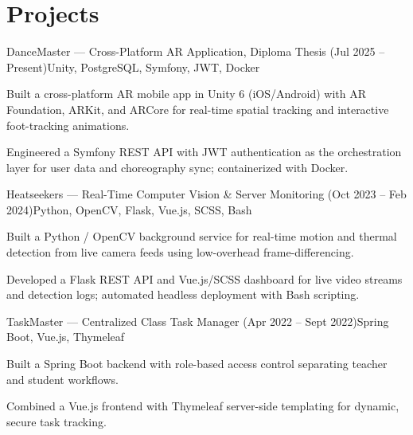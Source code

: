 \section*{Projects}

\begin{projectentry}{DanceMaster --- Cross-Platform AR Application, Diploma Thesis (Jul 2025 -- Present)}{Unity, PostgreSQL, Symfony, JWT, Docker}
  \item Built a cross-platform AR mobile app in Unity 6 (iOS/Android) with AR Foundation, ARKit, and ARCore for real-time spatial tracking and interactive foot-tracking animations.
  \item Engineered a Symfony REST API with JWT authentication as the orchestration layer for user data and choreography sync; containerized with Docker.
\end{projectentry}

\begin{projectentry}{Heatseekers --- Real-Time Computer Vision \& Server Monitoring (Oct 2023 -- Feb 2024)}{Python, OpenCV, Flask, Vue.js, SCSS, Bash}
  \item Built a Python / OpenCV background service for real-time motion and thermal detection from live camera feeds using low-overhead frame-differencing.
  \item Developed a Flask REST API and Vue.js/SCSS dashboard for live video streams and detection logs; automated headless deployment with Bash scripting.
\end{projectentry}

\begin{projectentry}{TaskMaster --- Centralized Class Task Manager (Apr 2022 -- Sept 2022)}{Spring Boot, Vue.js, Thymeleaf}
  \item Built a Spring Boot backend with role-based access control separating teacher and student workflows.
  \item Combined a Vue.js frontend with Thymeleaf server-side templating for dynamic, secure task tracking.
\end{projectentry}
